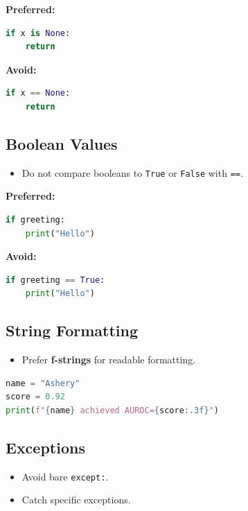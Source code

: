 \documentclass[11pt]{article}
\begin{document}
\textbf{Preferred:}
\begin{lstlisting}[language=Python]
if x is None:
    return
\end{lstlisting}

\textbf{Avoid:}
\begin{lstlisting}[language=Python]
if x == None:
    return
\end{lstlisting}

\subsection{Boolean Values}
\begin{itemize}[label={-},leftmargin=2em,labelsep=0.6em,itemsep=0.2em]
  \item Do not compare booleans to \texttt{True} or \texttt{False} with \texttt{==}.
\end{itemize}

\textbf{Preferred:}
\begin{lstlisting}[language=Python]
if greeting:
    print("Hello")
\end{lstlisting}

\textbf{Avoid:}
\begin{lstlisting}[language=Python]
if greeting == True:
    print("Hello")
\end{lstlisting}

\subsection{String Formatting}
\begin{itemize}[label={-},leftmargin=2em,labelsep=0.6em,itemsep=0.2em]
  \item Prefer \textbf{f-strings} for readable formatting.
\end{itemize}

\begin{lstlisting}[language=Python]
name = "Ashery"
score = 0.92
print(f"{name} achieved AUROC={score:.3f}")
\end{lstlisting}

\subsection{Exceptions}
\begin{itemize}[label={-},leftmargin=2em,labelsep=0.6em,itemsep=0.2em]
  \item Avoid bare \texttt{except:}.
  \item Catch specific exceptions.
\end{itemize}
\end{document}
